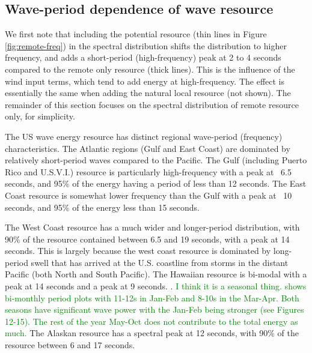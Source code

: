 \subsection{Wave-period dependence of wave resource}

We first note that including the potential resource (thin lines in Figure \ref{fig:remote-freq}) in the spectral distribution shifts the distribution to higher frequency, and adds a short-period (high-frequency) peak at 2 to 4 seconds compared to the remote only resource (thick lines). This is the influence of the wind input terms, which tend to add energy at high-frequency. The effect is essentially the same when adding the natural local resource (not shown). The remainder of this section focuses on the spectral distribution of remote resource only, for simplicity.

The US wave energy resource has distinct regional wave-period (frequency) characteristics. The Atlantic regions (Gulf and East Coast) are dominated by relatively short-period waves compared to the Pacific. The Gulf (including Puerto Rico and U.S.V.I.) resource is particularly high-frequency with a peak at ~6.5 seconds, and 95\% of the energy having a period of less than 12 seconds. The East Coast resource is somewhat lower frequency than the Gulf with a peak at ~10 seconds, and 95\% of the energy less than 15 seconds.

The West Coast resource has a much wider and longer-period distribution, with 90\% of the resource contained between 6.5 and 19 seconds, with a peak at 14 seconds. This is largely because the west coast resource is dominated by long-period swell that has arrived at the U.S. coastline from storms in the distant Pacific (both North and South Pacific). The Hawaiian resource is bi-modal with a peak at 14 seconds and a peak at 9 seconds. . \textcolor{green}{I think it is a seasonal thing. \citet{stopa2013wave} shows bi-monthly period plots with 11-12s in Jan-Feb and 8-10s in the Mar-Apr. Both seasons have significant wave power with the Jan-Feb being stronger (see Figures 12-15). The rest of the year May-Oct does not contribute to the total energy as much.} The Alaskan resource has a spectral peak at 12 seconds, with 90\% of the resource between 6 and 17 seconds.

